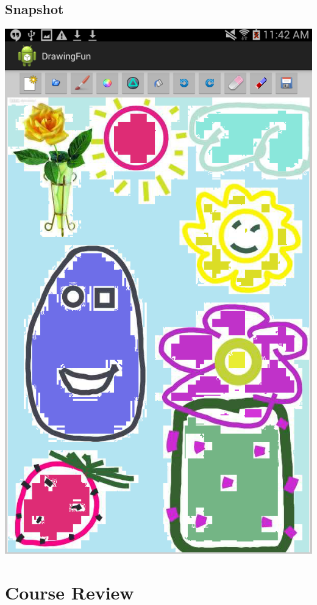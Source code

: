 \documentclass[9pt,b5paper]{article}
\begin{document}
\subsection{Snapshot}
\label{sec-6-3}
\includegraphics[width=.9\linewidth]{./Screenshot_2014-12-08-11-42-04.png}

\section{Course Review}
\label{sec-7}
\end{document}
